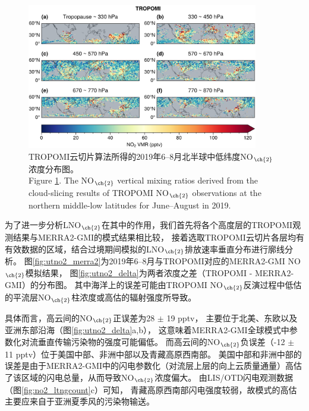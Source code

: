 \begin{figure}[H]
    \centering
    \includegraphics[width=0.9\textwidth]{./figures/utno2_tropomi.png}
    \caption{
    TROPOMI云切片算法所得的2019年6--8月北半球中低纬度NO$_{\ch{2}}$浓度分布图。 \\
    Figure \ref{fig:utno2_tropomi}. The NO$_{\ch{2}}$ vertical mixing ratios derived from the cloud-slicing results of TROPOMI NO$_{\ch{2}}$ observations at the northern middle-low latitudes for June--August in 2019.
    }
    \label{fig:utno2_tropomi}
\end{figure}

为了进一步分析LNO$_{\ch{2}}$在其中的作用，我们首先将各个高度层的TROPOMI观测结果与MERRA2-GMI的模式结果相比较，
接着选取TROPOMI云切片各层均有有效数据的区域，结合过境期间模拟的LNO$_{\ch{2}}$排放速率垂直分布进行廓线分析。
图\ref{fig:utno2_merra2}为2019年6--8月与TROPOMI对应的MERRA2-GMI NO$_{\ch{2}}$模拟结果，
图\ref{fig:utno2_delta}为两者浓度之差（TROPOMI - MERRA2-GMI）的分布图。
其中海洋上的误差可能由TROPOMI NO$_{\ch{2}}$反演过程中低估的平流层NO$_{\ch{2}}$柱浓度或高估的辐射强度所导致\citep{VanGeffen.2020}。

具体而言，高云间的NO$_{\ch{2}}$正误差为28 $\pm$ 19 pptv，
主要位于北美、东欧以及亚洲东部沿海（图\ref{fig:utno2_delta}a,b），
这意味着MERRA2-GMI全球模式中参数化对流垂直传输污染物的强度可能偏低。
而高云间的NO$_{\ch{2}}$负误差（-12 $\pm$ 11 pptv）位于美国中部、非洲中部以及青藏高原西南部。
美国中部和非洲中部的误差是由于MERRA2-GMI中的闪电参数化（对流层上层的向上云质量通量）高估了该区域的闪电总量，从而导致NO$_{\ch{2}}$浓度偏大\citep{Allen.2002,Allen.2010}。
由LIS/OTD闪电观测数据（图\ref{fig:no2_ltngcount}c）可知，
青藏高原西南部闪电强度较弱，故模式的高估主要应来自于亚洲夏季风的污染物输送。

